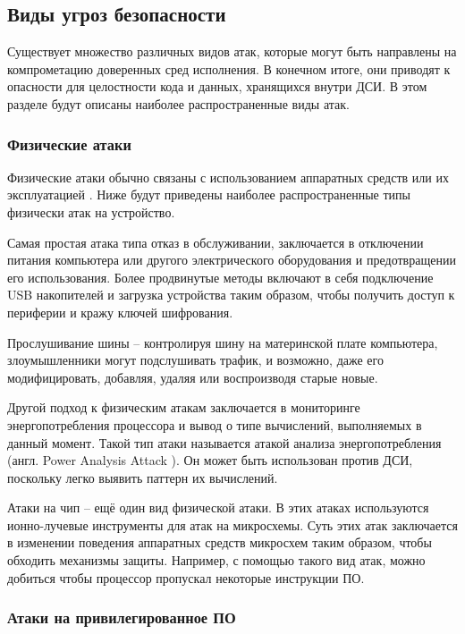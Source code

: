 \subsection{Виды угроз безопасности}
\label{sec:security}

Существует множество различных видов атак, которые могут быть направлены на компрометацию доверенных сред исполнения. В конечном итоге, они приводят к опасности для целостности кода и данных, хранящихся внутри ДСИ. В этом разделе будут описаны наиболее распространенные виды атак.

\subsubsection{Физические атаки}

Физические атаки обычно связаны с использованием аппаратных средств или их эксплуатацией \cite{attack-on-chip}. Ниже будут приведены наиболее распространенные типы физически атак на устройство.

Самая простая атака типа отказ в обслуживании, заключается в отключении питания компьютера или другого электрического оборудования и предотвращении его использования. Более продвинутые методы включают в себя подключение USB накопителей и загрузка устройства таким образом, чтобы получить доступ к периферии и кражу ключей шифрования.

Прослушивание шины \cite{attack-on-chip} -- контролируя шину на материнской плате компьютера, злоумышленники могут подслушивать трафик, и возможно, даже его модифицировать, добавляя, удаляя или воспроизводя старые новые.

Другой подход к физическим атакам заключается в мониторинге энергопотребления процессора и вывод о типе вычислений, выполняемых в данный момент. Такой тип атаки называется атакой анализа энергопотребления (англ. Power Analysis Attack \cite{power-analysis-attack}). Он может быть использован против ДСИ, поскольку легко выявить паттерн их вычислений.

Атаки на чип \cite{attack-on-chip} -- ещё один вид физической атаки. В этих атаках используются ионно-лучевые инструменты для атак на микросхемы. Суть этих атак заключается в изменении поведения аппаратных средств микросхем таким образом, чтобы обходить механизмы защиты. Например, с помощью такого вид атак, можно добиться чтобы процессор пропускал некоторые инструкции ПО.

\subsubsection{Атаки на привилегированное ПО}

